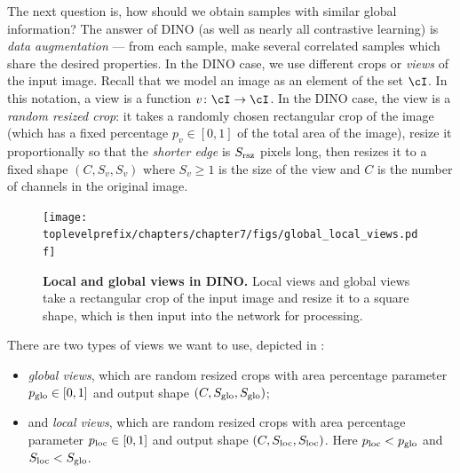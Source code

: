 \documentclass[../../book-main.tex]{subfiles}
\begin{document}
The next question is, how should we obtain samples with similar global information? The answer of DINO (as well as nearly all contrastive learning) is \textit{data augmentation} --- from each sample, make several correlated samples which share the desired properties. In the DINO case, we use different crops or \textit{views} of the input image. Recall that we model an image as an element of the set \(\cI\). In this notation, a view is a function \(v \colon \cI \to \cI\). In the DINO case, the view is a \textit{random resized crop}: it takes a randomly chosen rectangular crop of the image (which has a fixed percentage \(p_{v} \in [0, 1]\) of the total area of the image), resize it proportionally so that the \textit{shorter edge} is \(S_{\mathrm{rsz}}\) pixels long, then resizes it to a fixed shape \((C, S_{v}, S_{v})\) where \(S_{v} \geq 1\) is the size of the view and \(C\) is the number of channels in the original image. 

\begin{figure}
    \centering 
    \texttt{[image: \\toplevelprefix/chapters/chapter7/figs/global\_local\_views.pdf]}
    \caption{\textbf{Local and global views in DINO.} Local views and global views take a rectangular crop of the input image and resize it to a square shape, which is then input into the network for processing.}
    \label{fig:dino_local_global_views}
\end{figure}

There are two types of views we want to use, depicted in : 
\begin{itemize}
    \item \textit{global views}, which are random resized crops with area percentage parameter \(p_{\mathrm{glo}} \in [0, 1]\) and output shape \((C, S_{\mathrm{glo}}, S_{\mathrm{glo}})\);
    \item and \textit{local views}, which are random resized crops with area percentage parameter \(p_{\mathrm{loc}} \in [0, 1]\) and output shape \((C, S_{\mathrm{loc}}, S_{\mathrm{loc}})\). Here \(p_{\mathrm{loc}} < p_{\mathrm{glo}}\) and \(S_{\mathrm{loc}} < S_{\mathrm{glo}}\).
\end{itemize}
\end{document}
